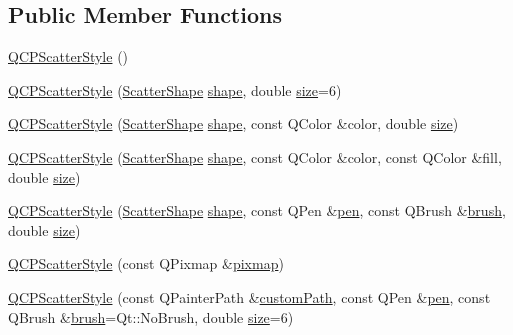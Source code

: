 \subsection*{Public Member Functions}
\begin{DoxyCompactItemize}
\item 
\hyperlink{classQCPScatterStyle_a8836018d9ad83ccd8870de8315c1be73}{Q\+C\+P\+Scatter\+Style} ()
\item 
\hyperlink{classQCPScatterStyle_a003d92f74f4561eda111862eadd62f28}{Q\+C\+P\+Scatter\+Style} (\hyperlink{classQCPScatterStyle_adb31525af6b680e6f1b7472e43859349}{Scatter\+Shape} \hyperlink{classQCPScatterStyle_a4462a25ef17769631f4e0aa81dadca4b}{shape}, double \hyperlink{classQCPScatterStyle_a1973ee650368f1c5f55507b78473f634}{size}=6)
\item 
\hyperlink{classQCPScatterStyle_afa059da858c864c7e05871dc602d7eab}{Q\+C\+P\+Scatter\+Style} (\hyperlink{classQCPScatterStyle_adb31525af6b680e6f1b7472e43859349}{Scatter\+Shape} \hyperlink{classQCPScatterStyle_a4462a25ef17769631f4e0aa81dadca4b}{shape}, const Q\+Color \&color, double \hyperlink{classQCPScatterStyle_a1973ee650368f1c5f55507b78473f634}{size})
\item 
\hyperlink{classQCPScatterStyle_a6e1b64f12cac7f07af180ae4316fd38d}{Q\+C\+P\+Scatter\+Style} (\hyperlink{classQCPScatterStyle_adb31525af6b680e6f1b7472e43859349}{Scatter\+Shape} \hyperlink{classQCPScatterStyle_a4462a25ef17769631f4e0aa81dadca4b}{shape}, const Q\+Color \&color, const Q\+Color \&fill, double \hyperlink{classQCPScatterStyle_a1973ee650368f1c5f55507b78473f634}{size})
\item 
\hyperlink{classQCPScatterStyle_a85acc4941d7e5c9bca5fa51377a77f49}{Q\+C\+P\+Scatter\+Style} (\hyperlink{classQCPScatterStyle_adb31525af6b680e6f1b7472e43859349}{Scatter\+Shape} \hyperlink{classQCPScatterStyle_a4462a25ef17769631f4e0aa81dadca4b}{shape}, const Q\+Pen \&\hyperlink{classQCPScatterStyle_a3c24c3bf37b561b4807aed9f1418ab58}{pen}, const Q\+Brush \&\hyperlink{classQCPScatterStyle_a46bf481d84bfa31b287dd43a3bf86d37}{brush}, double \hyperlink{classQCPScatterStyle_a1973ee650368f1c5f55507b78473f634}{size})
\item 
\hyperlink{classQCPScatterStyle_a63962094587a4c2258435aa7933996cc}{Q\+C\+P\+Scatter\+Style} (const Q\+Pixmap \&\hyperlink{classQCPScatterStyle_a9bab44cc41fcd585621a4b3e0e48231b}{pixmap})
\item 
\hyperlink{classQCPScatterStyle_a879c30647683b3cfbde2afecea815e6f}{Q\+C\+P\+Scatter\+Style} (const Q\+Painter\+Path \&\hyperlink{classQCPScatterStyle_a4dd4998dfb0d6889205668a06c790328}{custom\+Path}, const Q\+Pen \&\hyperlink{classQCPScatterStyle_a3c24c3bf37b561b4807aed9f1418ab58}{pen}, const Q\+Brush \&\hyperlink{classQCPScatterStyle_a46bf481d84bfa31b287dd43a3bf86d37}{brush}=Qt\+::\+No\+Brush, double \hyperlink{classQCPScatterStyle_a1973ee650368f1c5f55507b78473f634}{size}=6)

\end{DoxyCompactItemize}
